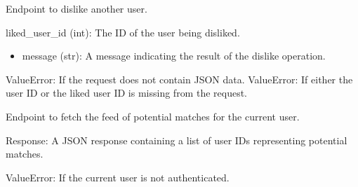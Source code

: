 \documentclass[letterpaper,10pt,english]{sphinxmanual}
\begin{document}
\begin{fulllineitems}
\label{\detokenize{routes.feed:routes.feed.routes.dislike}}
\pysigstartsignatures
{}
\pysigstopsignatures
\sphinxAtStartPar
Endpoint to dislike another user.
\begin{description}
\sphinxAtStartPar
liked\_user\_id (int): The ID of the user being disliked.

\begin{description}
\begin{itemize}
\item {} 
\sphinxAtStartPar
message (str): A message indicating the result of the dislike operation.

\end{itemize}

\end{description}

\sphinxAtStartPar
ValueError: If the request does not contain JSON data.
ValueError: If either the user ID or the liked user ID is missing from the request.

\end{description}

\end{fulllineitems}


\begin{fulllineitems}
\label{\detokenize{routes.feed:routes.feed.routes.getfeed}}
\pysigstartsignatures
{}
\pysigstopsignatures
\sphinxAtStartPar
Endpoint to fetch the feed of potential matches for the current user.
\begin{description}
\sphinxAtStartPar
Response: A JSON response containing a list of user IDs representing potential matches.

\sphinxAtStartPar
ValueError: If the current user is not authenticated.

\end{description}

\end{fulllineitems}
\end{document}
